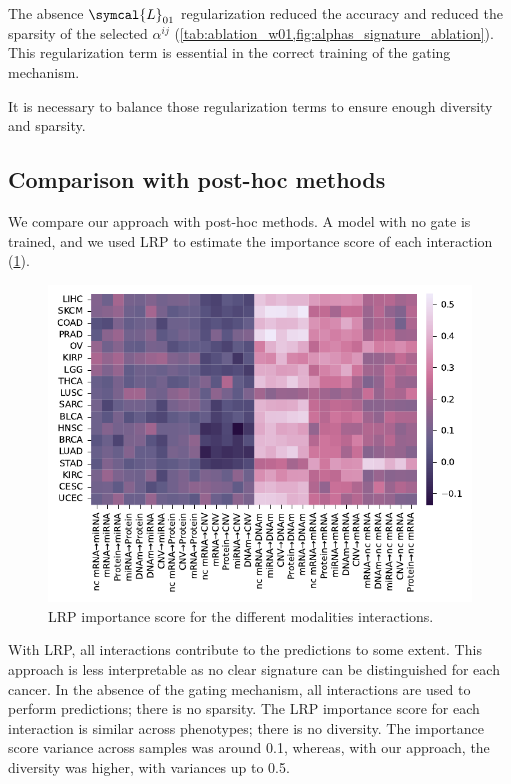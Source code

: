 \documentclass[../main.tex]{subfiles}
\begin{document}
     The absence \(\symcal{L}_{01}\) regularization reduced the accuracy and reduced the sparsity of the selected \(\alpha^{ij}\) (\cref{tab:ablation_w01,fig:alphas_signature_ablation}).
     This regularization term is essential in the correct training of the gating mechanism.

     It is necessary to balance those regularization terms to ensure enough diversity and sparsity.

 \subsection{Comparison with post-hoc methods}

     We compare our approach with post-hoc methods.
     A model with no gate is trained, and we used LRP to estimate the importance score of each interaction (\cref{fig:signature_LRP}).

     \begin{figure}[htbp]
         \centering
         \includegraphics[scale=0.75]{signature_alphas_LRP.pdf}
         \caption{LRP importance score for the different modalities interactions.}\label{fig:signature_LRP}
     \end{figure}

     With LRP, all interactions contribute to the predictions to some extent.
     This approach is less interpretable as no clear signature can be distinguished for each cancer.
     In the absence of the gating mechanism, all interactions are used to perform predictions; there is no sparsity.
     The LRP importance score for each interaction is similar across phenotypes; there is no diversity.
     The importance score variance across samples was around 0.1, whereas, with our approach, the diversity was higher, with variances up to 0.5.
\end{document}
